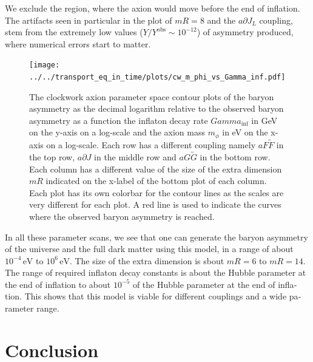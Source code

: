 \documentclass[master,       %
               twoside,        %
               BCOR10mm,       %
               english,ngerman, %
               ]{GAUBM}
\begin{document}
\begin{otherlanguage}{english}
We exclude the region, where the axion would move before the end of inflation.
The artifacts seen in particular in the plot of $mR = 8$ and the $a \partial J_L$ coupling, stem from the extremely low values ($Y / Y^\mathrm{obs} \sim 10^{-12}$) of asymmetry produced, where numerical errors start to matter.
\begin{figure}[H]
    \texttt{[image: ../../transport\_eq\_in\_time/plots/cw\_m\_phi\_vs\_Gamma\_inf.pdf]}
    \caption{The clockwork axion parameter space contour plots of the baryon asymmetry as the decimal logarithm relative to the observed baryon asymmetry as a function the inflaton decay rate $Gamma_\mathrm{inf}$ in GeV on the y-axis on a log-scale and the axion mass $m_\phi$ in eV on the x-axis on a log-scale.
    Each row has a different coupling namely $a F \tilde{F}$ in the top row, $a \partial J$ in the middle row and $a G \tilde{G}$ in the bottom row. Each column has a different value of the size of the extra dimension $mR$ indicated on the x-label of the bottom plot of each column. Each plot has its own colorbar for the contour lines as the scales are very different for each plot. A red line is used to indicate the curves where the observed baryon asymmetry is reached.}
	\label{fig:cw_m_phi_vs_Gamma_inf}
\end{figure}
In all these parameter scans, we see that one can generate the baryon asymmetry of the universe and the full dark matter using this model, in a range of about $10^{-4} \, \mathrm{eV}$ to $10^{6} \, \mathrm{eV}$. The size of the extra dimension is sbout $mR = 6$ to $mR = 14$. The range of required inflaton decay constants is about the Hubble parameter at the end of inflation to about $10^{-5}$ of the Hubble parameter at the end of inflation.
This shows that this model is viable for different couplings and a wide parameter range.


\chapter{Conclusion}


\end{otherlanguage}
\end{document}

